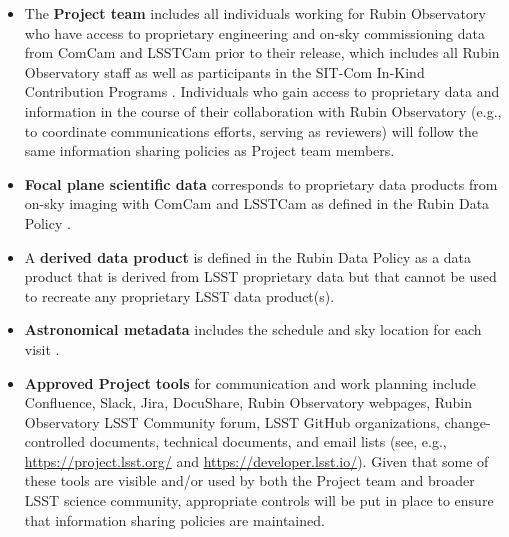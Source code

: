 \documentclass[SE,authoryear,toc,lsstdraft]{lsstdoc}
\begin{document}
\begin{itemize}

  \item The \textbf{Project team} includes all individuals working for Rubin Observatory who have access to proprietary engineering and on-sky commissioning data from ComCam and LSSTCam prior to their release, which includes all Rubin Observatory staff as well as participants in the SIT-Com In-Kind Contribution Programs .
  Individuals who gain access to proprietary data and information in the course of their collaboration with Rubin Observatory (e.g., to coordinate communications efforts, serving as reviewers) will follow the same information sharing policies as Project team members.

  \item \textbf{Focal plane scientific data} corresponds to proprietary data products from on-sky imaging with ComCam and LSSTCam as defined in the Rubin Data Policy .

  \item A \textbf{derived data product} is defined in the Rubin Data Policy  as a data product that is derived from LSST proprietary data but that cannot be used to recreate any proprietary LSST data product(s).

  \item \textbf{Astronomical metadata} includes the schedule and sky location for each visit .

  \item \textbf{Approved Project tools} for communication and work planning include Confluence, Slack, Jira, DocuShare, Rubin Observatory webpages, Rubin Observatory LSST Community forum, LSST GitHub organizations, change-controlled documents, technical documents, and email lists (see, e.g., \url{https://project.lsst.org/} and \url{https://developer.lsst.io/}).
  Given that some of these tools are visible and/or used by both the Project team and broader LSST science community, appropriate controls will be put in place to ensure that information sharing policies are maintained.

\end{itemize}
\end{document}
